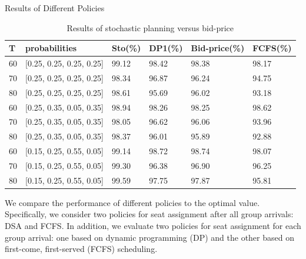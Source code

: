     \begin{frame}{Results of Different Policies}
        \scriptsize
        \begin{table}[ht]
          \centering
          \caption{Results of stochastic planning versus bid-price}
          \begin{tabular}{|l|l|l|l|l|l|}
          \hline
           T & probabilities & Sto(\%) & DP1(\%) & Bid-price(\%) & FCFS(\%) \\
          \hline
           60  & [0.25, 0.25, 0.25, 0.25]  & 99.12 & 98.42 & 98.38 & 98.17 \\
           70  & [0.25, 0.25, 0.25, 0.25]  & 98.34 & 96.87 & 96.24 & 94.75 \\
           80  & [0.25, 0.25, 0.25, 0.25]  & 98.61 & 95.69 & 96.02 & 93.18 \\
           \hline
           60  & [0.25, 0.35, 0.05, 0.35]  & 98.94 & 98.26 & 98.25 & 98.62 \\
           70  & [0.25, 0.35, 0.05, 0.35]  & 98.05 & 96.62 & 96.06 & 93.96 \\
           80  & [0.25, 0.35, 0.05, 0.35]  & 98.37 & 96.01 & 95.89 & 92.88 \\
          \hline
          60  & [0.15, 0.25, 0.55, 0.05]  & 99.14 & 98.72 & 98.74 & 98.07 \\
          70  & [0.15, 0.25, 0.55, 0.05]  & 99.30 & 96.38 & 96.90 & 96.25 \\
          80  & [0.15, 0.25, 0.55, 0.05]  & 99.59 & 97.75 & 97.87 & 95.81 \\
          \hline
          \end{tabular}
        \end{table}

          We compare the performance of different policies to the optimal value. Specifically, we consider two policies for seat assignment after all group arrivals: DSA and FCFS. In addition, we evaluate two policies for seat assignment for each group arrival: one based on dynamic programming (DP) and the other based on first-come, first-served (FCFS) scheduling.
    \end{frame}
      

